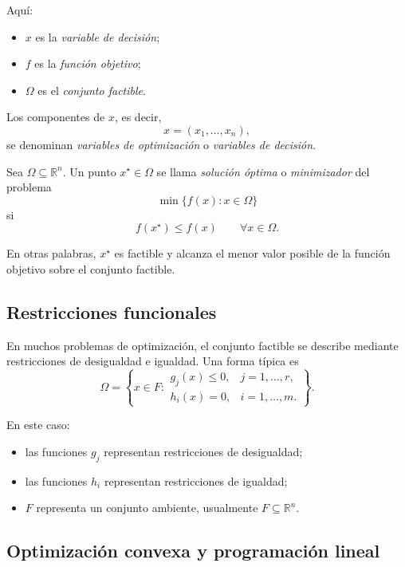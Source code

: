 Aquí:
\begin{itemize}
    \item \(x\) es la \emph{variable de decisión};
    \item \(f\) es la \emph{función objetivo};
    \item \(\Omega\) es el \emph{conjunto factible}.
\end{itemize}

Los componentes de \(x\), es decir,
\[
    x=(x_1,\dots,x_n),
\]
se denominan \emph{variables de optimización} o \emph{variables de decisión}.

\begin{definition}
Sea \(\Omega\subseteq \mathbb{R}^n\). Un punto \(x^\star\in \Omega\) se llama \emph{solución óptima} o \emph{minimizador} del problema
\[
    \min\{f(x):x\in \Omega\}
\]
si
\[
    f(x^\star)\leq f(x)
    \qquad \forall x\in \Omega.
\]
\end{definition}

En otras palabras, \(x^\star\) es factible y alcanza el menor valor posible de la función objetivo sobre el conjunto factible.

\subsection{Restricciones funcionales}

En muchos problemas de optimización, el conjunto factible se describe mediante restricciones de desigualdad e igualdad. Una forma típica es
\[
    \Omega
    =
    \left\{
    x\in F:
    \begin{array}{ll}
        g_j(x)\leq 0, & j=1,\dots,r,\\[2mm]
        h_i(x)=0, & i=1,\dots,m.
    \end{array}
    \right\}.
\]

En este caso:
\begin{itemize}
    \item las funciones \(g_j\) representan restricciones de desigualdad;
    \item las funciones \(h_i\) representan restricciones de igualdad;
    \item \(F\) representa un conjunto ambiente, usualmente \(F\subseteq \mathbb{R}^n\).
\end{itemize}

\subsection{Optimización convexa y programación lineal}

